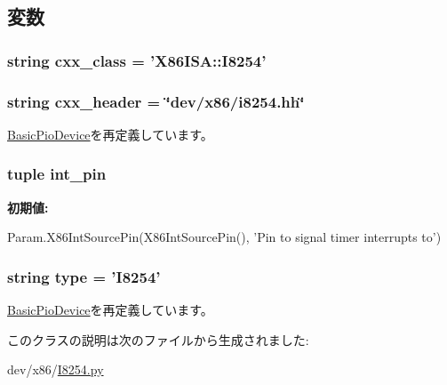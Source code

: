 \subsection{変数}
\hypertarget{classI8254_1_1I8254_a58cd55cd4023648e138237cfc0822ae3}{
\subsubsection[{cxx\_\-class}]{\setlength{\rightskip}{0pt plus 5cm}string {\bf cxx\_\-class} = '{\bf X86ISA::I8254}'}}
\label{classI8254_1_1I8254_a58cd55cd4023648e138237cfc0822ae3}
\hypertarget{classI8254_1_1I8254_a17da7064bc5c518791f0c891eff05fda}{
\subsubsection[{cxx\_\-header}]{\setlength{\rightskip}{0pt plus 5cm}string {\bf cxx\_\-header} = \char`\"{}dev/x86/i8254.hh\char`\"{}}}
\label{classI8254_1_1I8254_a17da7064bc5c518791f0c891eff05fda}


\hyperlink{classDevice_1_1BasicPioDevice_a17da7064bc5c518791f0c891eff05fda}{BasicPioDevice}を再定義しています。\hypertarget{classI8254_1_1I8254_a3e36d424287a16839b81d9c82d52c36a}{
\subsubsection[{int\_\-pin}]{\setlength{\rightskip}{0pt plus 5cm}tuple {\bf int\_\-pin}}}
\label{classI8254_1_1I8254_a3e36d424287a16839b81d9c82d52c36a}
{\bfseries 初期値:}
\begin{DoxyCode}
Param.X86IntSourcePin(X86IntSourcePin(),
            'Pin to signal timer interrupts to')
\end{DoxyCode}
\hypertarget{classI8254_1_1I8254_acce15679d830831b0bbe8ebc2a60b2ca}{
\subsubsection[{type}]{\setlength{\rightskip}{0pt plus 5cm}string {\bf type} = '{\bf I8254}'}}
\label{classI8254_1_1I8254_acce15679d830831b0bbe8ebc2a60b2ca}


\hyperlink{classDevice_1_1BasicPioDevice_acce15679d830831b0bbe8ebc2a60b2ca}{BasicPioDevice}を再定義しています。

このクラスの説明は次のファイルから生成されました:\begin{DoxyCompactItemize}
\item 
dev/x86/\hyperlink{I8254_8py}{I8254.py}\end{DoxyCompactItemize}
